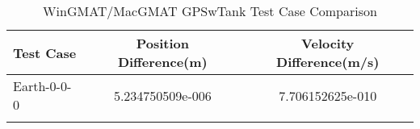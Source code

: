 \begin{table}[htbp!]
\centering
\caption{ WinGMAT/MacGMAT GPSwTank Test Case Comparison}
      \begin{tabular}{lcc}
      \hline\hline
          Test Case & Position Difference(m) & Velocity Difference(m/s) \\
         \hline
         Earth-0-0-0 & 5.234750509e-006 & 7.706152625e-010 \\
      \hline\hline
      \label{Table: GPSwTank WinGMAT-MacGMAT Table} 
\end{tabular}
\end{table}
